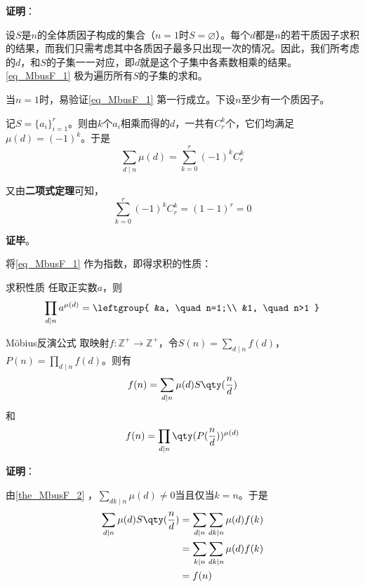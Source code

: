\textbf{证明}：

设$S$是$n$的全体质因子构成的集合（$n=1$时$S=\varnothing$）。每个$d$都是$n$的若干质因子求积的结果，而我们只需考虑其中各质因子最多只出现一次的情况。因此，我们所考虑的$d$，和$S$的子集一一对应，即$d$就是这个子集中各素数相乘的结果。\autoref{eq_MbusF_1} 极为遍历所有$S$的子集的求和。

当$n=1$时，易验证\autoref{eq_MbusF_1} 第一行成立。下设$n$至少有一个质因子。

记$S=\{a_i\}_{i=1}^r$。则由$k$个$a_i$相乘而得的$d$，一共有$C^k_r$个，它们均满足$\mu(d)=(-1)^k$。于是
\begin{equation}
\sum_{d\mid n}\mu(d)=\sum_{k=0}^r(-1)^kC^k_r
\end{equation}

又由\textbf{二项式定理}可知，
\begin{equation}
\sum_{k=0}^r(-1)^kC^k_r=(1-1)^r=0
\end{equation}

\textbf{证毕}。




将\autoref{eq_MbusF_1} 作为指数，即得求积的性质：


\begin{corollary}{求积性质}\label{cor_MbusF_1}
任取正实数$a$，则
\begin{equation}
\prod_{d\mid n}a^{\mu(d)}=
\leftgroup{
    &a, \quad n=1;\\
    &1, \quad n>1
}
\end{equation}
\end{corollary}






\begin{theorem}{Möbius反演公式}\label{the_MbusF_3}
取映射$f:\mathbb{Z}^+\to\mathbb{Z}^+$，令$S(n)=\sum_{d\mid n}f(d)$，$P(n)=\prod_{d\mid n}f(d)$。则有
\begin{equation}
f(n) = \sum_{d\mid n}\mu(d)S\qty(\frac{n}{d})
\end{equation}
和
\begin{equation}
f(n) = \prod_{d\mid n}\qty(P(\frac{n}{d}))^{\mu(d)}
\end{equation}
\end{theorem}

\textbf{证明}：

由\autoref{the_MbusF_2} ，$\sum_{dk\mid n}\mu(d)\neq 0$当且仅当$k=n$。于是
\begin{equation}
\begin{aligned}
\sum_{d\mid n}\mu(d)S\qty(\frac{n}{d})&=\sum_{d\mid n}\sum_{dk\mid n}\mu(d)f(k)\\
&=\sum_{k\mid n}\sum_{dk\mid n}\mu(d)f(k)\\
&=f(n)
\end{aligned}
\end{equation}


